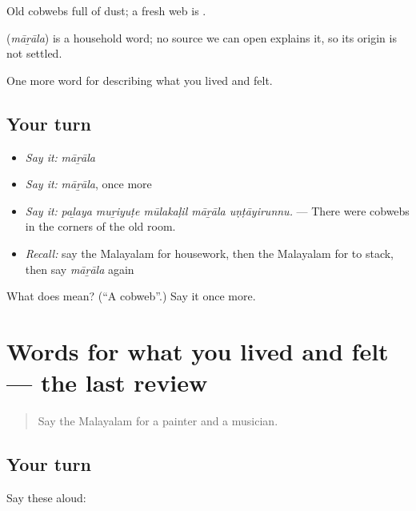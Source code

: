 Old cobwebs full of dust; a fresh web is .

\begin{cousinweb}
\textbf{} (\emph{māṟāla}) is a household word; no source we can open explains it, so its origin is not settled.
\end{cousinweb}

\begin{grammarlens}[title={What you've built}]
One more word for describing what you lived and felt.
\end{grammarlens}

\subsection*{Your turn}
\begin{itemize}
\raggedright
  \item \emph{Say it:} \emph{māṟāla}
  \item \emph{Say it:} \emph{māṟāla}, once more
  \item \emph{Say it:} \emph{paḻaya muṟiyuṭe mūlakaḷil māṟāla uṇṭāyirunnu.} — There were cobwebs in the corners of the old room.
  \item \emph{Recall:} say the Malayalam for housework, then the Malayalam for to stack, then say \emph{māṟāla} again
\end{itemize}

\begin{tcolorbox}[breakable,colback=teal!4,colframe=teal!35!black,title={Before you move on}]
What does  mean? (\textquotedblleft{}A cobweb\textquotedblright{}.) Say it once more.
\end{tcolorbox}
\section[(dialogue)]{Words for what you lived and felt — the last review}

\label{lesson:ML-R572-review-565-572}



\begin{quote}
Say the Malayalam for a painter and a musician.
\end{quote}

\subsection*{Your turn}
Say these aloud:

